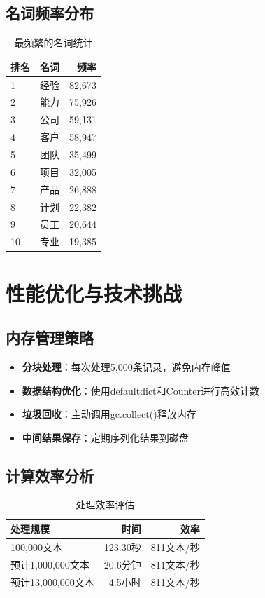 \documentclass[11pt,a4paper]{article}
\begin{document}
\subsection{名词频率分布}

\begin{table}[h]
\centering
\begin{tabular}{lrr}
\toprule
\textbf{排名} & \textbf{名词} & \textbf{频率} \\
\midrule
1 & 经验 & 82,673 \\
2 & 能力 & 75,926 \\
3 & 公司 & 59,131 \\
4 & 客户 & 58,947 \\
5 & 团队 & 35,499 \\
6 & 项目 & 32,005 \\
7 & 产品 & 26,888 \\
8 & 计划 & 22,382 \\
9 & 员工 & 20,644 \\
10 & 专业 & 19,385 \\
\bottomrule
\end{tabular}
\caption{最频繁的名词统计}
\end{table}

\section{性能优化与技术挑战}

\subsection{内存管理策略}

\begin{itemize}
    \item \textbf{分块处理}：每次处理5,000条记录，避免内存峰值
    \item \textbf{数据结构优化}：使用defaultdict和Counter进行高效计数
    \item \textbf{垃圾回收}：主动调用gc.collect()释放内存
    \item \textbf{中间结果保存}：定期序列化结果到磁盘
\end{itemize}

\subsection{计算效率分析}

\begin{table}[h]
\centering
\begin{tabular}{lrr}
\toprule
\textbf{处理规模} & \textbf{时间} & \textbf{效率} \\
\midrule
100,000文本 & 123.30秒 & 811文本/秒 \\
预计1,000,000文本 & 20.6分钟 & 811文本/秒 \\
预计13,000,000文本 & 4.5小时 & 811文本/秒 \\
\bottomrule
\end{tabular}
\caption{处理效率评估}
\end{table}
\end{document}
